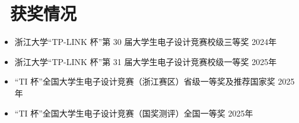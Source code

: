 \documentclass[11pt]{article}
\begin{document}
\section{\makebox[\widthof{\faGraduationCap}][c]{\color{CVBlue}\faList}\ 获奖情况}
\begin{itemize}
    \item 浙江大学“TP-LINK 杯”第 30 届大学生电子设计竞赛校级三等奖 \hfill 2024年
    \item 浙江大学“TP-LINK 杯”第 31 届大学生电子设计竞赛校级一等奖 \hfill 2025年
    \item “TI 杯”全国大学生电子设计竞赛（浙江赛区）省级一等奖及推荐国家奖 \hfill 2025年
    \item “TI 杯”全国大学生电子设计竞赛（国奖测评）全国一等奖 \hfill 2025年
\end{itemize}
\end{document}
